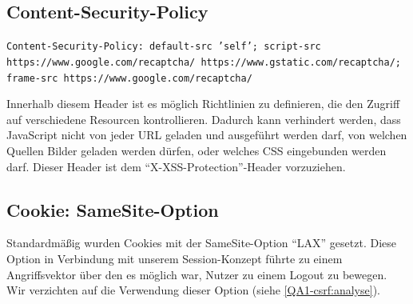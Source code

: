 \documentclass[12pt,DIV14,BCOR10mm,a4paper,parskip=half-,headsepline,headinclude,english,ngerman,bibliography=totocnumbered]{scrreprt}
\begin{document}
\subsection{Content-Security-Policy}
\begin{sloppypar}
\texttt{Content-Security-Policy: default-src 'self'; script-src https://www.google.com/recaptcha/ https://www.gstatic.com/recaptcha/; frame-src https://www.google.com/recaptcha/}
\end{sloppypar}
Innerhalb diesem Header ist es möglich Richtlinien zu definieren, die den Zugriff auf verschiedene Resourcen kontrollieren.
Dadurch kann verhindert werden, dass JavaScript nicht von jeder URL geladen und ausgeführt werden darf, von welchen Quellen Bilder geladen werden dürfen, oder welches CSS eingebunden werden darf.
Dieser Header ist dem \enquote{X-XSS-Protection}-Header vorzuziehen.


\subsection{Cookie: SameSite-Option}
Standardmäßig wurden Cookies mit der SameSite-Option \enquote{LAX} gesetzt. Diese Option in Verbindung mit unserem Session-Konzept führte zu einem Angriffsvektor über den es möglich war, Nutzer zu einem Logout zu bewegen. Wir verzichten auf die Verwendung dieser Option (siehe \ref{QA1-csrf:analyse}).  


\printbibliography

\printacronyms[title=Abkürzungsverzeichnis,toctitle=Abkürzungsverzeichnis]
\printglossary[title=Glossar,toctitle=Glossar,type=main]

\iftotalfigures
  \listoffigures
\fi

\end{document}
